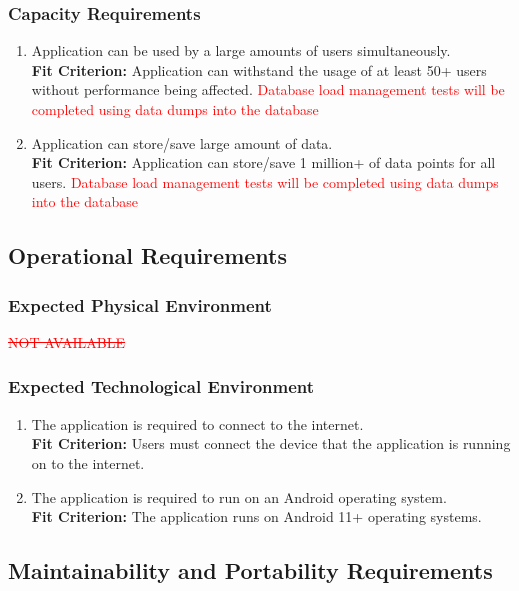 \documentclass[12pt,letterpaper]{article}
\begin{document}
\subsubsection{Capacity Requirements}
\begin{enumerate}[resume*] 
	\item Application can be used by a large amounts of users simultaneously.\\
	{\textbf{Fit Criterion:} Application can withstand the usage of at least 50+ users without performance being affected. \textcolor{red}{Database load management tests will be completed using data dumps into the database} }
	\item Application can store/save large amount of data.\\
	{\textbf{Fit Criterion:} Application can store/save 1 million+ of data points for all users. \textcolor{red}{Database load management tests will be completed using data dumps into the database}}
\end{enumerate}

\subsection{Operational Requirements}
\subsubsection{Expected Physical Environment}
\textcolor{red}{\sout{NOT AVAILABLE}}
\subsubsection{Expected Technological Environment}
\begin{enumerate}[{OE}1.] 
	\item The application is required to connect to the internet.\\
	{\textbf{Fit Criterion:} Users must connect the device that the application is running on to the internet.}
	\item The application is required to run on an Android operating system.\\
	{\textbf{Fit Criterion:} The application runs on Android 11+ operating systems.}
\end{enumerate}
\subsection{Maintainability and Portability Requirements}
\end{document}
